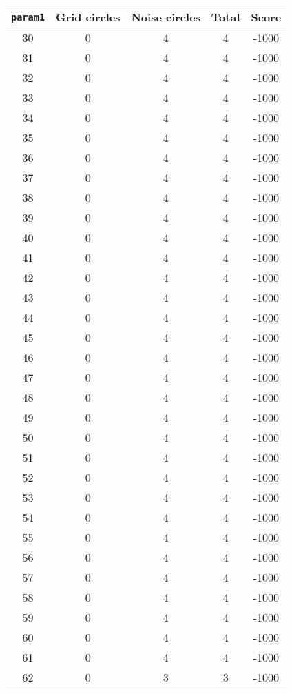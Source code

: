 \documentclass[letterpaper, 12pt]{article}
\begin{document}
\begin{longtable}{|c|c|c|c|c|}
\hline
\textbf{\texttt{param1}} & \textbf{Grid circles} & \textbf{Noise circles} & \textbf{Total} & \textbf{Score} \\
\hline
30 & 0 & 4 & 4 & -1000 \\
\hline
31 & 0 & 4 & 4 & -1000 \\
\hline
32 & 0 & 4 & 4 & -1000 \\
\hline
33 & 0 & 4 & 4 & -1000 \\
\hline
34 & 0 & 4 & 4 & -1000 \\
\hline
35 & 0 & 4 & 4 & -1000 \\
\hline
36 & 0 & 4 & 4 & -1000 \\
\hline
37 & 0 & 4 & 4 & -1000 \\
\hline
38 & 0 & 4 & 4 & -1000 \\
\hline
39 & 0 & 4 & 4 & -1000 \\
\hline
40 & 0 & 4 & 4 & -1000 \\
\hline
41 & 0 & 4 & 4 & -1000 \\
\hline
42 & 0 & 4 & 4 & -1000 \\
\hline
43 & 0 & 4 & 4 & -1000 \\
\hline
44 & 0 & 4 & 4 & -1000 \\
\hline
45 & 0 & 4 & 4 & -1000 \\
\hline
46 & 0 & 4 & 4 & -1000 \\
\hline
47 & 0 & 4 & 4 & -1000 \\
\hline
48 & 0 & 4 & 4 & -1000 \\
\hline
49 & 0 & 4 & 4 & -1000 \\
\hline
50 & 0 & 4 & 4 & -1000 \\
\hline
51 & 0 & 4 & 4 & -1000 \\
\hline
52 & 0 & 4 & 4 & -1000 \\
\hline
53 & 0 & 4 & 4 & -1000 \\
\hline
54 & 0 & 4 & 4 & -1000 \\
\hline
55 & 0 & 4 & 4 & -1000 \\
\hline
56 & 0 & 4 & 4 & -1000 \\
\hline
57 & 0 & 4 & 4 & -1000 \\
\hline
58 & 0 & 4 & 4 & -1000 \\
\hline
59 & 0 & 4 & 4 & -1000 \\
\hline
60 & 0 & 4 & 4 & -1000 \\
\hline
61 & 0 & 4 & 4 & -1000 \\
\hline
62 & 0 & 3 & 3 & -1000 \\

\end{longtable}
\end{document}
